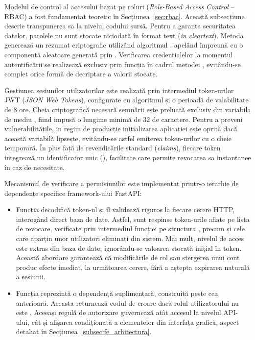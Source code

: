 \documentclass[../../main.tex]{subfiles}
\begin{document}
Modelul de control al accesului bazat pe roluri (\emph{Role-Based Access Control} -- RBAC) a fost fundamentat teoretic în Secțiunea~\ref{sec:rbac}. Această subsecțiune descrie transpunerea sa la nivelul codului sursă. Pentru a garanta securitatea datelor, parolele nu sunt stocate niciodată în format text (\emph{in cleartext}). Metoda  generează un rezumat criptografic utilizând algoritmul , apelând  împreună cu o componentă aleatoare generată prin . Verificarea credențialelor la momentul autentificării se realizează exclusiv prin funcția  în cadrul metodei  , evitându-se complet orice formă de decriptare a valorii stocate.

Gestiunea sesiunilor utilizatorilor este realizată prin intermediul token-urilor JWT (\emph{JSON Web Tokens}), configurate cu algoritmul  și o perioadă de valabilitate de 8 ore. Cheia criptografică necesară semnării este preluată exclusiv din variabila de mediu , fiind impusă o lungime minimă de 32 de caractere. Pentru a preveni vulnerabilitățile, în regim de producție inițializarea aplicației este oprită dacă această variabilă lipsește, evitându-se astfel emiterea token-urilor cu o cheie temporară. În plus față de revendicările standard (\emph{claims}), fiecare token integrează un identificator unic (), facilitate care permite revocarea sa instantanee în caz de necesitate.

Mecanismul de verificare a permisiunilor este implementat printr-o ierarhie de dependențe specifice framework-ului FastAPI:

\begin{itemize} \item Funcția  decodifică token-ul și îl validează riguros la fiecare cerere HTTP, interogând direct baza de date. Astfel, sunt respinse token-urile aflate pe lista de revocare, verificate prin intermediul funcției  pe structura , precum și cele care aparțin unor utilizatori eliminați din sistem. Mai mult, nivelul de acces este extras din baza de date, ignorându-se valoarea stocată inițial în token. Această abordare garantează că modificările de rol sau ștergerea unui cont produc efecte imediat, la următoarea cerere, fără a aștepta expirarea naturală a sesiunii.
	\item Funcția  reprezintă o dependență suplimentară, construită peste cea anterioară. Aceasta returnează codul de eroare  dacă rolul utilizatorului nu este . Aceeași regulă de autorizare guvernează atât accesul la nivelul API-ului, cât și afișarea condiționată a elementelor din interfața grafică, aspect detaliat în Secțiunea~\ref{subsec:fe_arhitectura}.
\end{itemize}
\end{document}
